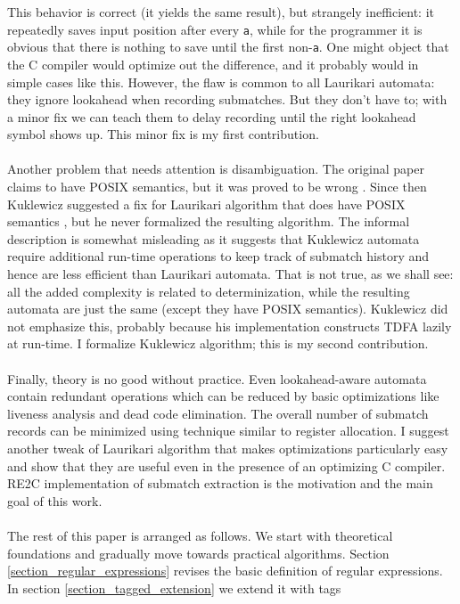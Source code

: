 \documentclass{article}
\theoremstyle{definition}
\begin{document}
\begin{multicols}{2}
This behavior is correct (it yields the same result), but strangely inefficient:
it repeatedly saves input position after every \texttt{a},
while for the programmer it is obvious that there is nothing to save until the first non-\texttt{a}.
One might object that the C compiler would optimize out the difference,
and it probably would in simple cases like this.
However, the flaw is common to all Laurikari automata:
they ignore lookahead when recording submatches.
But they don't have to; with a minor fix we can teach them
to delay recording until the right lookahead symbol shows up.
This minor fix is my first contribution.
\\ \\
Another problem that needs attention is disambiguation.
The original paper \cite{Lau01} claims to have POSIX semantics, but it was proved to be wrong \cite{LTU}.
Since then Kuklewicz suggested a fix for Laurikari algorithm that does have POSIX semantics \cite{Regex-TDFA}, but he never formalized the resulting algorithm.
The informal description \cite{Kuk07} is somewhat misleading as it suggests that Kuklewicz automata
require additional run-time operations to keep track of submatch history and hence are less efficient than Laurikari automata.
That is not true, as we shall see: all the added complexity is related to determinization,
while the resulting automata are just the same (except they have POSIX semantics).
Kuklewicz did not emphasize this, probably because his implementation constructs TDFA lazily at run-time.
I formalize Kuklewicz algorithm; this is my second contribution.
\\ \\
Finally, theory is no good without practice.
Even lookahead-aware automata contain redundant operations
which can be reduced by basic optimizations like liveness analysis and dead code elimination.
The overall number of submatch records can be minimized using technique similar to register allocation.
I suggest another tweak of Laurikari algorithm that makes optimizations particularly easy
and show that they are useful even in the presence of an optimizing C compiler.
RE2C implementation of submatch extraction is the motivation and the main goal of this work.
\\ \\
The rest of this paper is arranged as follows.
We start with theoretical foundations and gradually move towards practical algorithms.
Section \ref{section_regular_expressions} revises the basic definition of regular expressions.
In section \ref{section_tagged_extension} we extend it with tags

\end{multicols}
\end{document}
